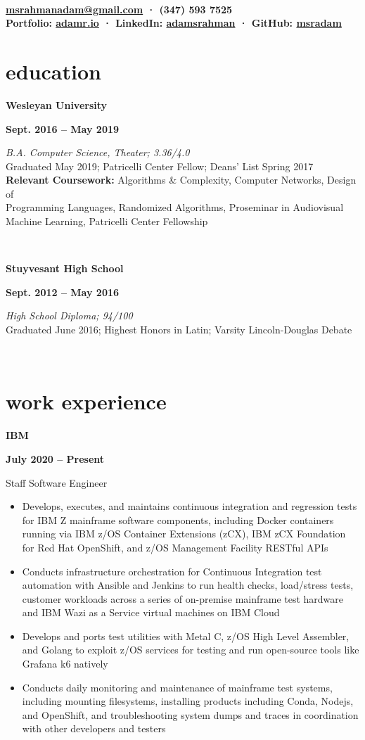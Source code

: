 \documentclass[letterpaper, 11pt]{article}
\author{Adam M. Rahman}
\makeatletter
\renewcommand{\maketitle}{
	\hspace{.125\textwidth}
	\begin{minipage}[t]{.75\textwidth}
    \begin{center}
        \fontsize{15pt}{15pt}\selectfont\bfseries \theauthor \\
        \fontsize{10pt}{15pt}\selectfont\normalfont
        \vspace{-0.5mm}
        \href{mailto:munawaradamr@gmail.com}{msrahmanadam@gmail.com} · (347) 593 7525 \\
        \vspace{-0.5mm}
        Portfolio: \href{https://adamr.io}{adamr.io} · 
        LinkedIn: \href{https://www.linkedin.com/in/adamsrahman/}{adamsrahman} · 
        GitHub: \href{https://github.com/msradam}{msradam}  \\ 
        \end{center}
    \end{minipage}}
\newcommand{\eduentry}[4]{
        \begin{minipage}[b]{0.5\textwidth}
        \raggedright
        \bf\large #2
        \end{minipage}%
        \begin{minipage}[b]{0.5\textwidth}
        \raggedleft
        \bf #1
        \end{minipage}

    \begin{minipage}[t]{.80\linewidth}
    \vspace{-3mm}
    \textit{#3} \small{#4}
    \end{minipage}\\
    \vspace{1mm}
    }
\newcommand{\expentry}[5]{

    \begin{minipage}[b]{0.5\textwidth}
        \raggedright
        \bf\large #3
        \end{minipage}%
        \begin{minipage}[b]{0.5\textwidth}
        \raggedleft
        \bf {#1} -- {#2}
        \end{minipage}

    \begin{minipage}[t]{\linewidth}
    \vspace{-3mm}
    #4
    \vspace{-1.75mm}
    \small{#5}
    \end{minipage}\\
    \vspace{1mm}
    }
\makeatother
\begin{document}
    \maketitle
    \vspace{.075cm}


    \section{education}
    \eduentry{Sept. 2016 -- May 2019}
    {Wesleyan University}
    {B.A. Computer Science, Theater; 3.36/4.0}
    {\\ Graduated May 2019; Patricelli Center Fellow; Deans' List Spring 2017\\
    \textbf{Relevant Coursework:} Algorithms \& Complexity, Computer Networks, Design of \\ Programming Languages, Randomized Algorithms, Proseminar in Audiovisual\\Machine Learning, Patricelli Center Fellowship}

    \eduentry{Sept. 2012 -- May 2016}
    {Stuyvesant High School}
    {High School Diploma; 94/100}
    {\\ Graduated June 2016; Highest Honors in Latin; Varsity Lincoln-Douglas Debate}

    \section{work experience}
    \expentry{July 2020}
    {Present}
    {IBM}
    {Staff Software Engineer}
    {
        \begin{itemize}
          \setlength\itemsep{-0.5mm}
            \item Develops, executes, and maintains continuous integration and regression tests
            for IBM Z mainframe software components, including Docker containers running via IBM z/OS Container
            Extensions (zCX), IBM zCX Foundation for Red Hat OpenShift,  and z/OS Management Facility RESTful APIs
            \item Conducts infrastructure orchestration for Continuous Integration test automation with Ansible and Jenkins to run
            health checks, load/stress tests, customer workloads across a series of on-premise mainframe test hardware and IBM Wazi as a Service virtual machines on IBM Cloud
            \item Develops and ports test utilities with Metal C, z/OS High Level Assembler, and Golang to exploit z/OS services for testing and run open-source tools like Grafana k6 natively
            \item Conducts daily monitoring and maintenance of mainframe test systems,
            including mounting filesystems, installing products including Conda, Nodejs,
            and OpenShift, and troubleshooting system dumps and traces in coordination
            with other developers and testers
        \end{itemize}
        
    }
\end{document}
